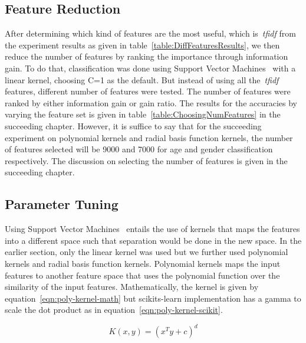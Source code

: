 \documentclass[a4paper]{llncs}
\begin{document}
\subsection{Feature Reduction}
After determining which kind of features are the most useful, which is~\textit{tfidf} from the experiment results as given in table~\ref{table:DiffFeaturesResults}, we then reduce the number of features by ranking the importance through information gain. To do that, classification was done using Support Vector Machines~\cite{cortes1995support} with a linear kernel, choosing C=1 as the default. But instead of using all the~\textit{tfidf} features, different number of features were tested. The number of features were ranked by either information gain or gain ratio. The results for the accuracies by varying the feature set is given in table~\ref{table:ChoosingNumFeatures} in the succeeding chapter. However, it is suffice to say that for the succeeding experiment on polynomial kernels and radial basis function kernels, the number of features selected will be 9000 and 7000 for age and gender classification respectively. The discussion on selecting the number of features is given in the succeeding chapter. 




\subsection{Parameter Tuning}
Using Support Vector Machines~\cite{cortes1995support} entails the use of kernels that maps the features into a different space such that separation would be done in the new space. In the earlier section, only the linear kernel was used but we further used polynomial kernels and radial basis function kernels. Polynomial kernels maps the input features to another feature space that uses the polynomial function over the similarity of the input features. Mathematically, the kernel is given by equation~\ref{eqn:poly-kernel-math} but scikits-learn implementation has a gamma to scale the dot product as in equation~\ref{eqn:poly-kernel-scikit}.

\begin{equation}
K(x,y) = (x^Ty + c)^d
\label{eqn:poly-kernel-math}
\end{equation}
\end{document}
